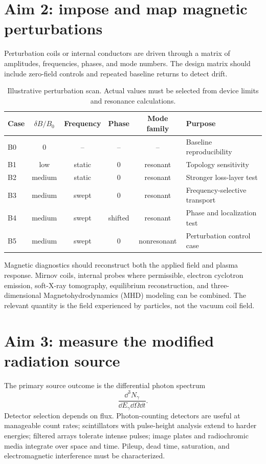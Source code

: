\section{Aim 2: impose and map magnetic perturbations}

Perturbation coils or internal conductors are driven through a matrix of amplitudes, frequencies, phases, and mode numbers. The design matrix should include zero-field controls and repeated baseline returns to detect drift.

\begin{table}[H]
\centering
\caption{Illustrative perturbation scan. Actual values must be selected from device limits and resonance calculations.}
\label{tab:perturbation-scan}
\begin{tabularx}{\textwidth}{lccccX}
\toprule
Case & $\delta B/B_0$ & Frequency & Phase & Mode family & Purpose \\
\midrule
B0 & 0 & -- & -- & -- & Baseline reproducibility \\
B1 & low & static & 0 & resonant & Topology sensitivity \\
B2 & medium & static & 0 & resonant & Stronger loss-layer test \\
B3 & medium & swept & 0 & resonant & Frequency-selective transport \\
B4 & medium & swept & shifted & resonant & Phase and localization test \\
B5 & medium & swept & 0 & nonresonant & Perturbation control case \\
\bottomrule
\end{tabularx}
\end{table}

Magnetic diagnostics should reconstruct both the applied field and plasma response. Mirnov coils, internal probes where permissible, electron cyclotron emission, soft-X-ray tomography, equilibrium reconstruction, and three-dimensional Magnetohydrodynamics (MHD) modeling can be combined. The relevant quantity is the field experienced by particles, not the vacuum coil field.

\section{Aim 3: measure the modified radiation source}

The primary source outcome is the differential photon spectrum
\begin{equation}
\frac{\dd^3N_\gamma}{\dd E_\gamma\dd\Omega\dd t}.
\end{equation}
Detector selection depends on flux. Photon-counting detectors are useful at manageable count rates; scintillators with pulse-height analysis extend to harder energies; filtered arrays tolerate intense pulses; image plates and radiochromic media integrate over space and time. Pileup, dead time, saturation, and electromagnetic interference must be characterized.

